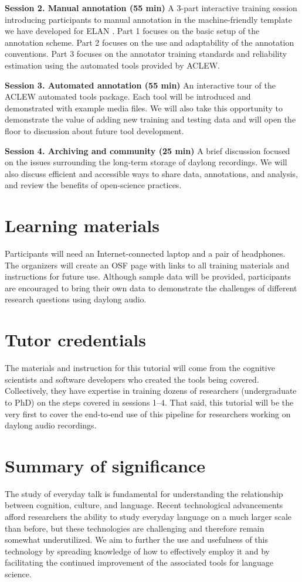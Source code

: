\documentclass[10pt,letterpaper]{article}
\begin{document}
\textbf{Session 2. Manual annotation (55 min)} A 3-part interactive training session introducing participants to manual annotation in the machine-friendly template we have developed for ELAN \cite{casillas2017ACLEWDAS}. Part 1 focuses on the basic setup of the annotation scheme. Part 2 focuses on the use and adaptability of the annotation conventions. Part 3 focuses on the annotator training standards and reliability estimation using the automated tools provided by ACLEW.

\textbf{Session 3. Automated annotation (55 min)} An interactive tour of the ACLEW automated tools package. Each tool will be introduced and demonstrated with example media files. We will also take this opportunity to demonstrate the value of adding new training and testing data and will open the floor to discussion about future tool development.

\textbf{Session 4. Archiving and community (25 min)} A brief discussion focused on the issues surrounding the long-term storage of daylong recordings. We will also discuss efficient and accessible ways to share data, annotations, and analysis, and review the benefits of open-science practices.

\section{Learning materials}
Participants will need an Internet-connected laptop and a pair of headphones. The organizers will %
create an OSF page with links to all training materials and instructions for future use. Although sample data will be provided, participants are encouraged to bring their own data to demonstrate the challenges of different research questions using daylong audio.

\section{Tutor credentials}
The materials and instruction for this tutorial will come from the cognitive scientists and software developers who created the tools being covered. Collectively, they have expertise in training dozens of researchers (undergraduate to PhD) on the steps covered in sessions 1--4. That said, this tutorial will be the very first to cover the end-to-end use of this pipeline for researchers working on daylong audio recordings.

\section{Summary of significance}
The study of everyday talk is fundamental for understanding the relationship between cognition, culture, and language. Recent technological advancements afford researchers the ability to study everyday language on a much larger scale than before, but these technologies are challenging and therefore remain somewhat underutilized. We aim to further the use and usefulness of this technology by spreading knowledge of how to effectively employ it and by facilitating the continued improvement of the associated tools for language science.
\end{document}
